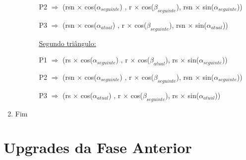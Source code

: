 \documentclass[a4paper]{article}
\begin{document}
\begin{enumerate}
\begin{enumerate}
\begin{enumerate}
      \vspace{0.2cm}

          \hspace{-0.5cm} P2 $\Rightarrow$ (rsn $\times$ cos($\alpha_{seguinte}$) , r $\times$ cos($\beta_{seguinte}$), rsn $\times$ sin($\alpha_{seguinte}$))

      \vspace{0.2cm}

          \hspace{0.0cm} P3 $\Rightarrow$ (rsn $\times$ cos($\alpha_{atual}$) , r $\times$ cos($\beta_{seguinte}$), rsn $\times$ sin($\alpha_{atual}$))

      \vspace{0.5cm}

      \underline{Segundo triângulo:}

      \vspace{0.5cm}

          \hspace{-0.25cm} P1 $\Rightarrow$ (rs $\times$ cos($\alpha_{seguinte}$) , r $\times$ cos($\beta_{atual}$), rs $\times$ sin($\alpha_{seguinte}$))

      \vspace{0.2cm}

          \hspace{-0.75cm} P2 $\Rightarrow$ (rsn $\times$ cos($\alpha_{seguinte}$) , r $\times$ cos($\beta_{seguinte}$), rsn $\times$ sin($\alpha_{seguinte}$))

      \vspace{0.2cm}

          \hspace{0.0cm} P3 $\Rightarrow$ (rs $\times$ cos($\alpha_{atual}$) , r $\times$ cos($\beta_{seguinte}$), rs $\times$ sin($\alpha_{atual}$))

      \vspace{0.2cm}

    \end{enumerate}

    \end{enumerate}

    \item Fim
    \end{enumerate}
    \rmfamily




\newpage

\section{Upgrades da Fase Anterior}
\end{document}
